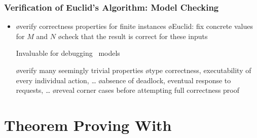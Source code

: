 \documentclass[fleqn]{beamer}
\begin{document}



\begin{frame}
  \frametitle{Verification of Euclid's Algorithm: Model Checking}

  \begin{itemize}
  \item {}

    \begin{itemize}
    \o verify correctness properties for finite instances
    \o Euclid: fix concrete values for $M$ and $N$
    \o check that the result is correct for these inputs
    \end{itemize}

  \oo {}

  \oo \alert{Invaluable for debugging \tlaplus\ models}

    \begin{itemize}
    \o verify many seemingly trivial properties
    \o type correctness, executability of every individual action, \ldots
    \o absence of deadlock, eventual response to requests, \ldots
    \o reveal corner cases before attempting full correctness proof
    \end{itemize}
  \end{itemize}

\end{frame}

\section{Theorem Proving With \tlaps}
\end{document}
